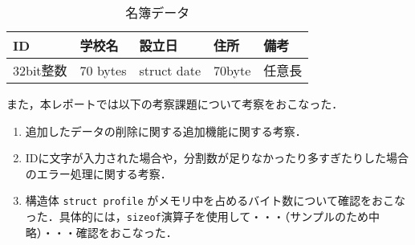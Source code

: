 \documentclass[a4j,11pt]{jarticle}
\begin{document}
\begin{table}[t] %
    \centering %
    \caption{実装するコマンド}
    \label{tbl:commands}
     \end{table}

	\begin{table}[t]
	\centering %
    \caption{名簿データ}
    \label{tbl:structure_profile}
\begin{tabular}{|l|l|l|l|l|}
\hline
ID      & 学校名      & 設立日         & 住所     & 備考  \\ \hline
32bit整数 & 70 bytes & struct date & 70byte & 任意長 \\ \hline
\end{tabular}
	\end{table}

また，本レポートでは以下の考察課題について考察をおこなった．

\begin{enumerate}
\setlength{\parskip}{2pt}\setlength{\itemsep}{2pt}%
    \item 追加したデータの削除に関する追加機能に関する考察．
    \item IDに文字が入力された場合や，分割数が足りなかったり多すぎたりした場合のエラー処理に関する考察．
    \item 構造体 \verb|struct profile| がメモリ中を占めるバイト数について確認をおこなった．具体的には，\verb|sizeof|演算子を使用して・・・（サンプルのため中略）・・・確認をおこなった．
\end{enumerate}
\end{document}
